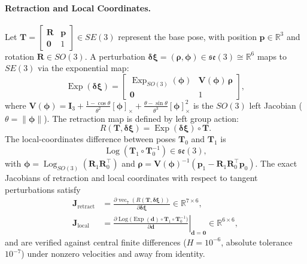 \documentclass[11pt,a4paper]{article}
\begin{document}
\paragraph{Retraction and Local Coordinates.}
Let $\mathbf{T} = \begin{bmatrix} \mathbf{R} & \mathbf{p} \\ \mathbf{0} & 1 \end{bmatrix} \in SE(3)$ represent the base pose, with position $\mathbf{p}\in\mathbb{R}^3$ and rotation $\mathbf{R}\in SO(3)$. A perturbation $\boldsymbol{\delta\xi} = (\boldsymbol{\rho}, \boldsymbol{\phi}) \in \mathfrak{se}(3) \cong \mathbb{R}^6$ maps to $SE(3)$ via the exponential map:
\begin{equation}
  \operatorname{Exp}(\boldsymbol{\delta\xi}) = \begin{bmatrix} \operatorname{Exp}_{SO(3)}(\boldsymbol{\phi}) & \mathbf{V}(\boldsymbol{\phi})\,\boldsymbol{\rho} \\ \mathbf{0} & 1 \end{bmatrix},
  \label{eq:se3_exp}
\end{equation}
where $\mathbf{V}(\boldsymbol{\phi}) = \mathbf{I}_3 + \frac{1-\cos\theta}{\theta^2}[\boldsymbol{\phi}]_\times + \frac{\theta-\sin\theta}{\theta^3}[\boldsymbol{\phi}]_\times^2$ is the $SO(3)$ left Jacobian ($\theta = \lVert\boldsymbol{\phi}\rVert$).
The retraction map is defined by left group action:
\begin{equation}
  R(\mathbf{T}, \boldsymbol{\delta\xi}) = \operatorname{Exp}(\boldsymbol{\delta\xi}) \circ \mathbf{T}.
  \label{eq:se3_retract}
\end{equation}
The local-coordinates difference between poses $\mathbf{T}_0$ and $\mathbf{T}_1$ is
\begin{equation}
  \operatorname{Log}(\mathbf{T}_1 \circ \mathbf{T}_0^{-1}) \in \mathfrak{se}(3),
  \label{eq:se3_local_coords}
\end{equation}
with $\boldsymbol{\phi} = \operatorname{Log}_{SO(3)}(\mathbf{R}_1 \mathbf{R}_0^{\!\top})$ and $\boldsymbol{\rho} = \mathbf{V}(\boldsymbol{\phi})^{-1} (\mathbf{p}_1 - \mathbf{R}_1 \mathbf{R}_0^{\!\top} \mathbf{p}_0)$.
The exact Jacobians of retraction and local coordinates with respect to tangent perturbations satisfy
\begin{align}
  \mathbf{J}_{\mathrm{retract}} &= \frac{\partial \operatorname{vec}_7(R(\mathbf{T}, \boldsymbol{\delta\xi}))}{\partial \boldsymbol{\delta\xi}} \in \mathbb{R}^{7\times 6}, \\
  \mathbf{J}_{\mathrm{local}} &= \left. \frac{\partial \operatorname{Log}\big(\operatorname{Exp}(\mathbf{d})\circ \mathbf{T}_1 \circ \mathbf{T}_0^{-1}\big)}{\partial \mathbf{d}} \right|_{\mathbf{d}=\mathbf{0}} \in \mathbb{R}^{6\times 6},
\end{align}
and are verified against central finite differences ($H=10^{-6}$, absolute tolerance $10^{-7}$) under nonzero velocities and away from identity.
\end{document}
